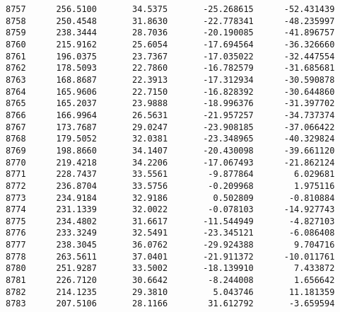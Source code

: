\documentclass[11pt]{article}
\begin{document}
\begin{Verbatim}[commandchars=\\\{\}]
8757      256.5100       34.5375       -25.268615      -52.431439   
8758      250.4548       31.8630       -22.778341      -48.235997   
8759      238.3444       28.7036       -20.190085      -41.896757   
8760      215.9162       25.6054       -17.694564      -36.326660   
8761      196.0375       23.7367       -17.035022      -32.447554   
8762      178.5093       22.7860       -16.782579      -31.685681   
8763      168.8687       22.3913       -17.312934      -30.590878   
8764      165.9606       22.7150       -16.828392      -30.644860   
8765      165.2037       23.9888       -18.996376      -31.397702   
8766      166.9964       26.5631       -21.957257      -34.737374   
8767      173.7687       29.0247       -23.908185      -37.066422   
8768      179.5052       32.0381       -23.348965      -40.329824   
8769      198.8660       34.1407       -20.430098      -39.661120   
8770      219.4218       34.2206       -17.067493      -21.862124   
8771      228.7437       33.5561        -9.877864        6.029681   
8772      236.8704       33.5756        -0.209968        1.975116   
8773      234.9184       32.9186         0.502809       -0.810884   
8774      231.1339       32.0022        -0.078103      -14.927743   
8775      234.4802       31.6617       -11.544949       -4.827103   
8776      233.3249       32.5491       -23.345121       -6.086408   
8777      238.3045       36.0762       -29.924388        9.704716   
8778      263.5611       37.0401       -21.911372      -10.011761   
8780      251.9287       33.5002       -18.139910        7.433872   
8781      226.7120       30.6642        -8.244008        1.656642   
8782      214.1235       29.3810         5.043746       11.181359   
8783      207.5106       28.1166        31.612792       -3.659594   


\end{Verbatim}
\end{document}
